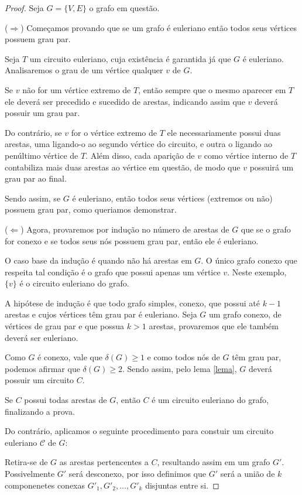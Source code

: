 \documentclass[12pt, a4paper]{article}
\begin{document}
\begin{proof}

Seja $G = \{V, E\}$ o grafo em questão.

($\Rightarrow$) Começamos provando que se um grafo é euleriano então todos seus vértices possuem grau par.

Seja $T$ um circuito euleriano, cuja existência é garantida já que $G$ é euleriano. Analisaremos o grau de um vértice qualquer $v$ de $G$.

Se $v$ não for um vértice extremo de $T$, então sempre que o mesmo aparecer em $T$ ele deverá ser precedido e sucedido de arestas, indicando assim que $v$ deverá possuir um grau par.

Do contrário, se $v$ for o vértice extremo de $T$ ele necessariamente possui duas arestas, uma ligando-o ao segundo vértice do circuito, e outra o ligando ao penúltimo vértice de $T$. 
Além disso, cada aparição de $v$ como vértice interno de $T$ contabiliza mais duas arestas ao vértice em questão, de modo que $v$ possuirá um grau par ao final.

Sendo assim, se $G$ é euleriano, então todos seus vértices (extremos ou não) possuem grau par, como queriamos demonstrar.

($\Leftarrow$) Agora, provaremos por indução no número de arestas de $G$ que se o grafo for conexo e se todos seus nós possuem grau par, então ele é euleriano.

O caso base da indução é quando não há arestas em $G$. 
O único grafo conexo que respeita tal condição é o grafo que possui apenas um vértice $v$.
Neste exemplo, $\{v\}$ é o circuito euleriano do grafo.

A hipótese de indução é que todo grafo simples, conexo, que possui até $k-1$ arestas e cujos vértices têm grau par é euleriano. 
Seja $G$ um grafo conexo, de vértices de grau par e que possua $k > 1$ arestas, provaremos que ele também deverá ser euleriano.

Como $G$ é conexo, vale que $\delta(G) \geq 1$ e como todos nós de $G$ têm grau par, podemos afirmar que $\delta(G) \geq 2$. 
Sendo assim, pelo lema \ref{lema}, $G$ deverá possuir um circuito $C$.

Se $C$ possui todas arestas de $G$, então $C$ é um circuito euleriano do grafo, finalizando a prova.

Do contrário, aplicamos o seguinte procedimento para constuir um circuito euleriano $\mathcal{C}$ de $G$:

Retira-se de $G$ as arestas pertencentes a $C$, resultando assim em um grafo $G'$. 
Possivelmente $G'$ será desconexo, por isso definimos que $G'$ será a união de $k$ componenetes conexas $G'_1, G'_2, \dots, G'_k$ disjuntas entre si.


\end{proof}
\end{document}
